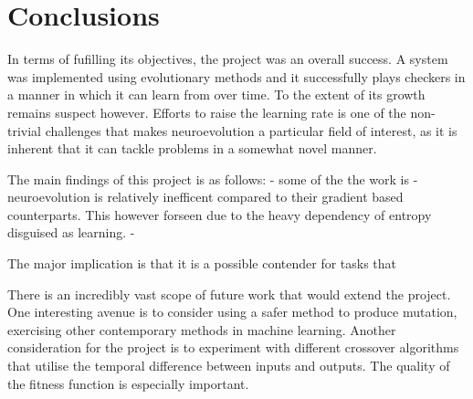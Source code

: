 \documentclass[12pt,a4paper]{article}
\begin{document}
\section{Conclusions}

    In terms of fufilling its objectives, the project was an overall success. A system was implemented using evolutionary methods and it successfully plays checkers in a manner in which it can learn from over time. To the extent of its growth remains suspect however. Efforts to raise the learning rate is one of the non-trivial challenges that makes neuroevolution a particular field of interest, as it is inherent that it can tackle problems in a somewhat novel manner.
    
    The main findings of this project is as follows:
    - some of the the work is 
    - neuroevolution is relatively inefficent compared to their gradient based counterparts. This however forseen due to the heavy dependency of entropy disguised as learning.
    - 
    
    The major implication is that it is a possible contender for tasks that 
    
    
    There is an incredibly vast scope of future work that would extend the project. One interesting avenue is to consider using a safer method to produce mutation, exercising other contemporary methods in machine learning. 
    Another consideration for the project is to experiment with different crossover algorithms that utilise the temporal difference between inputs and outputs. 
    The quality of the fitness function is especially important.


        
    

\end{document}
